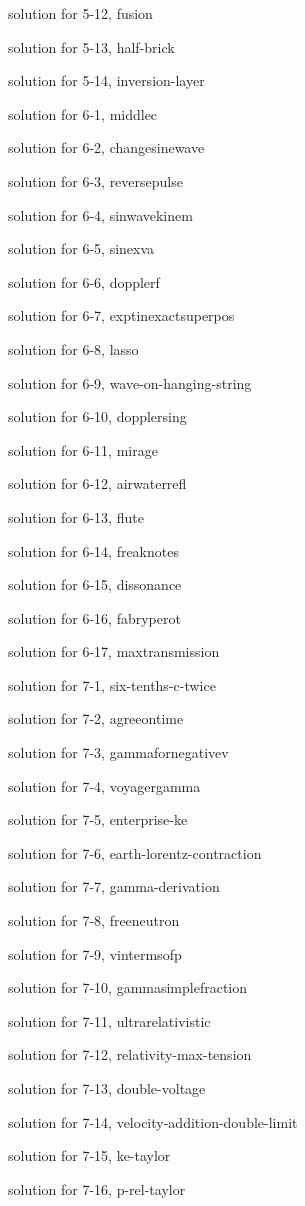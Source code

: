 \documentclass{problems}
\begin{document}
solution for 5-12, fusion

solution for 5-13, half-brick

solution for 5-14, inversion-layer

solution for 6-1, middlec

solution for 6-2, changesinewave

solution for 6-3, reversepulse

solution for 6-4, sinwavekinem

solution for 6-5, sinexva

solution for 6-6, dopplerf

solution for 6-7, exptinexactsuperpos

solution for 6-8, lasso

solution for 6-9, wave-on-hanging-string

solution for 6-10, dopplersing

solution for 6-11, mirage

solution for 6-12, airwaterrefl

solution for 6-13, flute

solution for 6-14, freaknotes

solution for 6-15, dissonance

solution for 6-16, fabryperot

solution for 6-17, maxtransmission

solution for 7-1, six-tenths-c-twice

solution for 7-2, agreeontime

solution for 7-3, gammafornegativev

solution for 7-4, voyagergamma

solution for 7-5, enterprise-ke

solution for 7-6, earth-lorentz-contraction

solution for 7-7, gamma-derivation

solution for 7-8, freeneutron

solution for 7-9, vintermsofp

solution for 7-10, gammasimplefraction

solution for 7-11, ultrarelativistic

solution for 7-12, relativity-max-tension

solution for 7-13, double-voltage

solution for 7-14, velocity-addition-double-limit

solution for 7-15, ke-taylor

solution for 7-16, p-rel-taylor
\end{document}
